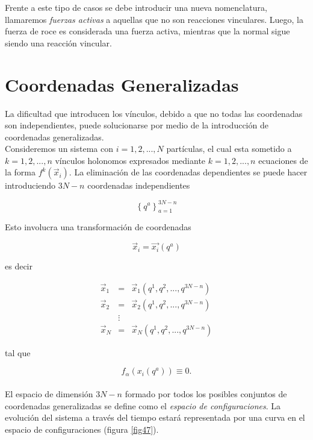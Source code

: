 \documentclass[12pt]{report}
\begin{document}
Frente a este tipo de casos se debe introducir una nueva nomenclatura, llamaremos \textit{fuerzas activas} a aquellas que no son reacciones vinculares. Luego, la fuerza de roce es considerada una fuerza activa, mientras que la normal sigue siendo una reacción vincular.





\section{Coordenadas Generalizadas}

La dificultad que introducen los vínculos, debido a que no todas las coordenadas son independientes, puede solucionarse por medio de la introducción de coordenadas generalizadas. \\

Consideremos un sistema con $i=1,2,..., N$ partículas, el cual esta sometido a $k=1,2,..., n$ vínculos holonomos expresados mediante $k=1,2,...,n$ ecuaciones de la forma $f^k(\vec{x}_i)$. La eliminación de las coordenadas dependientes se puede hacer introduciendo  $3N-n$ coordenadas independientes

\begin{equation}
\left\{ q^a \right\}_{a=1}^{3N-n}
\end{equation}

Esto involucra una transformación de coordenadas 


\begin{equation}
\vec{x}_i = \vec{x_i}(q^a) 
\end{equation}

es decir 


\begin{eqnarray}
\vec{x}_1 &=&\vec{x}_1 \left( q^1 , q^2 , ... , q^{3N-n} \right)  \\
\vec{x}_2 &=&\vec{x}_2 \left( q^1 , q^2 , ... , q^{3N-n} \right) \\
&\vdots& \\
\vec{x}_N &=&\vec{x}_N \left( q^1 , q^2 , ... , q^{3N-n} \right) 
\end{eqnarray}

tal que


\begin{equation}
f_{\alpha}\left( x_i(q^a) \right) \equiv 0.
\end{equation} 
\\



El espacio de dimensión $3N-n$ formado por todos los posibles conjuntos de coordenadas generalizadas se define como el \textit{espacio de configuraciones}. La evolución del sistema a través del tiempo estará representada por una curva en el espacio de configuraciones (figura \ref{fig47}).  \\
\end{document}
